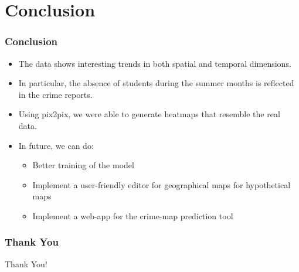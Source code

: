 \documentclass{beamer}
\begin{document}
\section{Conclusion}
\begin{frame}
    \frametitle{Conclusion}
    \begin{itemize}
        \item The data shows interesting trends in both spatial and temporal dimensions.
        \item In particular, the absence of students during the summer months is reflected in the crime reports.
        \item Using pix2pix, we were able to generate heatmaps that resemble the real data.
        \item In future, we can do:
        \begin{itemize}
        \item Better training of the model
        \item Implement a user-friendly editor for geographical maps for hypothetical maps
        \item Implement a web-app for the crime-map prediction tool
        \end{itemize}
    \end{itemize}
\end{frame}

\begin{frame}
    \frametitle{Thank You}
    \centering
    \Huge Thank You!
\end{frame}
\end{document}
